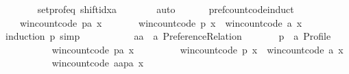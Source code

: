 \begin{isabellebody}
\ \ \ \ \ \ \isamarkupfalse%
\ set{\isacharunderscore}{\kern0pt}prof{\isacharunderscore}{\kern0pt}eq\ shift{\isacharunderscore}{\kern0pt}idx{\isacharunderscore}{\kern0pt}a\isanewline
\ \ \ \ \ \ \isamarkupfalse%
\ auto\isanewline
\ \ \isamarkupfalse%
\isanewline
\ \ \isamarkupfalse%
\ pref{\isacharunderscore}{\kern0pt}count{\isacharunderscore}{\kern0pt}code{\isacharunderscore}{\kern0pt}induct{\isacharcolon}{\kern0pt}\isanewline
\ \ \ \ {\isachardoublequoteopen}win{\isacharunderscore}{\kern0pt}count{\isacharunderscore}{\kern0pt}code\ {\isacharparenleft}{\kern0pt}p{\isacharat}{\kern0pt}{\isacharbrackleft}{\kern0pt}a{\isacharbrackright}{\kern0pt}{\isacharparenright}{\kern0pt}\ x\ {\isacharequal}{\kern0pt}\isanewline
\ \ \ \ \ \ win{\isacharunderscore}{\kern0pt}count{\isacharunderscore}{\kern0pt}code\ p\ x\ {\isacharplus}{\kern0pt}\ win{\isacharunderscore}{\kern0pt}count{\isacharunderscore}{\kern0pt}code\ {\isacharbrackleft}{\kern0pt}a{\isacharbrackright}{\kern0pt}\ x{\isachardoublequoteclose}\isanewline
\ \ \isamarkupfalse%
\ {\isacharparenleft}{\kern0pt}induction\ p{\isacharcomma}{\kern0pt}\ simp{\isacharparenright}{\kern0pt}\isanewline
\ \ \ \ \isamarkupfalse%
\isanewline
\ \ \ \ \ \ aa\ {\isacharcolon}{\kern0pt}{\isacharcolon}{\kern0pt}\ {\isachardoublequoteopen}{\isacharprime}{\kern0pt}a\ Preference{\isacharunderscore}{\kern0pt}Relation{\isachardoublequoteclose}\ \isanewline
\ \ \ \ \ \ p\ {\isacharcolon}{\kern0pt}{\isacharcolon}{\kern0pt}\ {\isachardoublequoteopen}{\isacharprime}{\kern0pt}a\ Profile{\isachardoublequoteclose}\isanewline
\ \ \ \ \isamarkupfalse%
\isanewline
\ \ \ \ \ \ {\isachardoublequoteopen}win{\isacharunderscore}{\kern0pt}count{\isacharunderscore}{\kern0pt}code\ {\isacharparenleft}{\kern0pt}p{\isacharat}{\kern0pt}{\isacharbrackleft}{\kern0pt}a{\isacharbrackright}{\kern0pt}{\isacharparenright}{\kern0pt}\ x\ {\isacharequal}{\kern0pt}\isanewline
\ \ \ \ \ \ \ \ win{\isacharunderscore}{\kern0pt}count{\isacharunderscore}{\kern0pt}code\ p\ x\ {\isacharplus}{\kern0pt}\ win{\isacharunderscore}{\kern0pt}count{\isacharunderscore}{\kern0pt}code\ {\isacharbrackleft}{\kern0pt}a{\isacharbrackright}{\kern0pt}\ x{\isachardoublequoteclose}\isanewline
\ \ \ \ \isamarkupfalse%
\isanewline
\ \ \ \ \ \ {\isachardoublequoteopen}win{\isacharunderscore}{\kern0pt}count{\isacharunderscore}{\kern0pt}code\ {\isacharparenleft}{\kern0pt}{\isacharparenleft}{\kern0pt}aa{\isacharhash}{\kern0pt}p{\isacharparenright}{\kern0pt}{\isacharat}{\kern0pt}{\isacharbrackleft}{\kern0pt}a{\isacharbrackright}{\kern0pt}{\isacharparenright}{\kern0pt}\ x\ {\isacharequal}{\kern0pt}\isanewline

\end{isabellebody}
